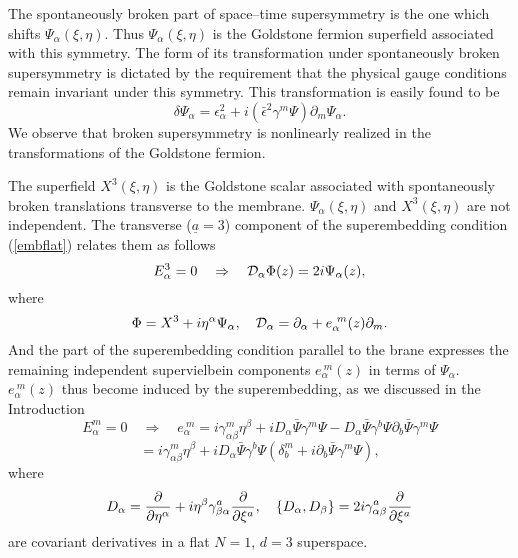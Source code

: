 \documentclass[a4paper,12pt]{article}
\begin{document}
The spontaneously broken part of space--time supersymmetry is the
one which shifts $\Psi_\alpha(\xi,\eta)$. Thus
$\Psi_\alpha(\xi,\eta)$ is the Goldstone fermion superfield
associated with this symmetry. The form of its transformation
under spontaneously broken supersymmetry is dictated by the
requirement that the physical gauge conditions remain invariant
under this symmetry. This transformation is easily found to be
\begin{equation}\label{susy2}
\delta\Psi_\alpha=\epsilon^2_\alpha+i(\bar\epsilon^2\gamma^m\Psi)\partial_m\Psi_\alpha.
\end{equation}
We observe that broken supersymmetry is nonlinearly realized in
the transformations of the Goldstone fermion.

The superfield $X^3(\xi,\eta)$ is the Goldstone scalar associated
with spontaneously broken translations transverse to the membrane.
$\Psi_\alpha(\xi,\eta)$ and $X^3(\xi,\eta)$ are not independent.
The transverse ($\underline a=3$) component of the superembedding
condition (\ref{embflat}) relates them as follows
\begin{equation}\label{tran}
E^3_\alpha=0 \quad \Rightarrow \quad {\cal D}_\alpha
\Phi(z)=2i\Psi_\alpha(z),
\end{equation}
where
\begin{equation}\label{X3}
\Phi=X^3+i\eta^\alpha\Psi_\alpha, \quad {\cal
D}_\alpha=\partial_\alpha+e^{~m}_\alpha(z)\partial_m.
\end{equation}
And the part of the superembedding condition parallel to the
brane expresses the remaining independent supervielbein components
$e^{~m}_\alpha(z)$ in terms of $\Psi_\alpha$. $e^{~m}_\alpha(z)$ thus
become induced by the superembedding, as we discussed in the
Introduction
$$
E^m_\alpha =0 \quad \Rightarrow \quad
e^{~m}_\alpha=i\gamma^m_{\alpha\beta}\eta^\beta+iD_\alpha\bar\Psi\gamma^m\Psi-
D_\alpha\bar\Psi\gamma^b\Psi
\partial_b\bar\Psi\gamma^m\Psi
$$
\begin{equation}\label{epsi}
=i\gamma^m_{\alpha\beta}\eta^\beta+iD_\alpha\bar\Psi\gamma^b\Psi
(\delta_b^m+i\partial_b\bar\Psi\gamma^m\Psi),
\end{equation}
where
\begin{equation}\label{Da}
D_\alpha={\partial\over{\partial\eta^\alpha}}+i\eta^\beta\gamma^a_{\beta\alpha}
{\partial\over{\partial\xi^a}}, \quad
\{D_\alpha,D_\beta\}=2i\gamma^a_{\alpha\beta}
{\partial\over{\partial\xi^a}}
\end{equation}
are covariant derivatives in a flat $N=1$, $d=3$ superspace.
\end{document}
